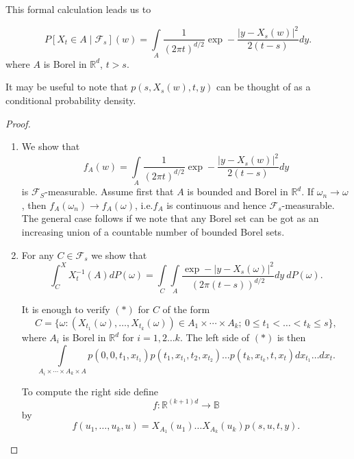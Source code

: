 This formal calculation leads us to

\begin{theorem*}
$$
P[X_{t}\in A\mid \mathscr{F}_{s}](w)=\int\limits_{A}\frac{1}{(2\pi
  t)^{d/2}}\exp -\frac{|y-X_{s}(w)|^{2}}{2(t-s)}dy.
$$
where $A$ is Borel in $\mathbb{R}^{d}$, $t>s$.
\end{theorem*}

\begin{remark*}
It may be useful to note that $p(s,X_{s}(w),t,y)$ can be thought of as
a conditional probability density.
\end{remark*}

\begin{proof}
\begin{enumerate}
\renewcommand{\theenumi}{\roman{enumi}}
\renewcommand{\labelenumi}{(\theenumi)}
\item We show that
$$
f_{A}(w)=\int\limits_{A}\frac{1}{(2\pi
  t)^{d/2}}\exp-\frac{|y-X_{s}(w)|^{2}}{2(t-s)}dy
$$
is $\mathscr{F}_{S}$-measurable. Assume first that $A$ is bounded and
Borel in $\mathbb{R}^{d}$. If $\omega_{n}\to \omega$, then
$f_{A}(\omega_{n})\to f_{A}(\omega)$, i.e.\@ $f_{A}$ is continuous and
hence $\mathscr{F}_{s}$-measurable. The general case follows if we
note that any Borel set can be got as an increasing union of a
countable number of bounded Borel sets.

\item For any $C\in \mathscr{F}_{s}$ we show that
\begin{equation*}
\int^{X}_{C}X^{-1}_{t}(A)dP(\omega)=\int\limits_{C}\int\limits_{A}\frac{\exp-|y-X_{s}(\omega)|^{2}}{(2\pi
  (t-s))^{d/2}}dy\ dP(\omega).\tag{*}
\end{equation*}

It is enough to verify $(*)$ for $C$ of the form
{\fontsize{10pt}{12pt}\selectfont
$$
C=\big\{\omega:(X_{t_{1}}(\omega),\ldots,X_{t_{k}}(\omega))\in
A_{1}\times\cdots\times A_{k};\ 0\leq t_{1}<\ldots<t_{k}\leq s\big\},
$$}\relax
where $A_{i}$ is Borel in $\mathbb{R}^{d}$ for $i=1,2\ldots k$. The
left side of $(*)$ is then
{\fontsize{10pt}{12pt}\selectfont
$$
\int\limits_{A_{i}\times\cdots\times A_{k}\times
  A}p(0,0,t_{1},x_{t_{1}})p(t_{1},x_{t_{1}},t_{2},x_{t_{2}})\ldots
p(t_{k},x_{t_{k}},t,x_{t})dx_{t_{1}}\ldots dx_{t}.
$$}\pageoriginale

To compute the right side define
$$
f:\mathbb{R}^{(k+1)d}\to \mathbb{B}
$$
by
$$
f(u_{1},\ldots,u_{k},u)=X_{A_{1}}(u_{1})\ldots
X_{A_{k}}(u_{k})p(s,u,t,y).
$$


\end{enumerate}
\end{proof}

